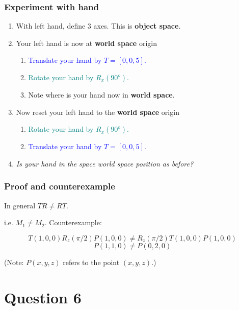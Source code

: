 \documentclass{beamer}
\begin{document}
\begin{frame}
    \frametitle{Experiment with hand}

    \begin{enumerate}
        \item With left hand, define 3 axes. This is \textbf{object space}. 
        \item Your left hand is now at \textbf{world space} origin
        \begin{enumerate}
            \item \textcolor{blue}{Translate your hand by $T = [0, 0, 5]$.}
            \item \textcolor{teal}{Rotate your hand by $R_x(90^o)$.}
            \item Note where is your hand now in \textbf{world space}.
        \end{enumerate}
        \item Now reset your left hand to the \textbf{world space} origin
        \begin{enumerate}
            \item \textcolor{teal}{Rotate your hand by $R_x(90^o)$.}
            \item \textcolor{blue}{Translate your hand by $T = [0, 0, 5]$.}
        \end{enumerate}
        \item \textit{Is your hand in the space world space position as before?}
    \end{enumerate}

\end{frame}

\begin{frame}
    \frametitle{Proof and counterexample}

    \begin{tcolorbox}
        In general $TR \neq RT$.
    \end{tcolorbox}

    i.e. $M_1 \neq M_2$. Counterexample:

    $$T(1, 0, 0) R_z(\pi/2) P(1, 0, 0) \neq R_z(\pi/2) T(1, 0, 0) P(1, 0, 0)$$
    $$P(1, 1, 0) \neq P(0, 2, 0)$$

    (Note: $P(x,y,z)$ refers to the point $(x,y,z)$.)

\end{frame}

\section{Question 6}
\end{document}
